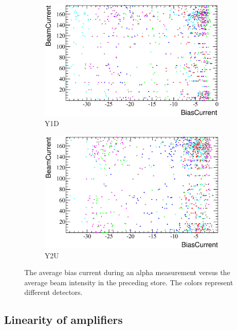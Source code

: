 \documentclass[a4paper,12pt]{article}
\begin{document}
\begin{figure}[p]
\begin{subfigure}[t]{0.5\textwidth}
\includegraphics[width=\textwidth]{gfx/run13_alpha_study/Y1D/c_hBiasCurrent_BeamCurrent.eps}
\caption{Y1D}
\end{subfigure}
%
\begin{subfigure}[t]{0.5\textwidth}
\includegraphics[width=\textwidth]{gfx/run13_alpha_study/Y2U/c_hBiasCurrent_BeamCurrent.eps}
\caption{Y2U}
\end{subfigure}
%
\caption{The average bias current during an alpha measurement versus the average
beam intensity in the preceding store. The colors represent different
detectors.}
\end{figure}


\subsection{Linearity of amplifiers}
\end{document}
